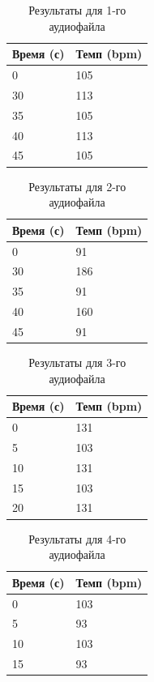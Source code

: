 \begin{table}[!h]
	\begin{center}
		\caption{\label{tab:soad_drums}Результаты для 1-го аудиофайла}
		\begin{tabular}{|p{8cm}|p{8cm}|}
			\hline
			Время (с) & Темп (bpm)\\
			\hline
			0 & 105\\
			\hline
			30 & 113\\
			\hline
			35 & 105\\
			\hline
			40 & 113\\
			\hline
			45 & 105\\
			\hline
		\end{tabular}
	\end{center}
\end{table}

\begin{table}[!h]
	\begin{center}
		\caption{\label{tab:soad_guitar}Результаты для 2-го аудиофайла}
		\begin{tabular}{|p{8cm}|p{8cm}|}
			\hline
			Время (с) & Темп (bpm)\\
			\hline
			0 & 91\\
			\hline
			30 & 186\\
			\hline
			35 & 91\\
			\hline
			40 & 160\\
			\hline
			45 & 91\\
			\hline
		\end{tabular}
	\end{center}
\end{table}

\begin{table}[!h]
	\begin{center}
		\caption{\label{tab:soad_minus}Результаты для 3-го аудиофайла}
		\begin{tabular}{|p{8cm}|p{8cm}|}
			\hline
			Время (с) & Темп (bpm)\\
			\hline
			0 & 131\\
			\hline
			5 & 103\\
			\hline
			10 & 131\\
			\hline
			15 & 103\\
			\hline
			20 & 131\\
			\hline
		\end{tabular}
	\end{center}
\end{table}

\begin{table}[!h]
	\begin{center}
		\caption{\label{tab:soad_full}Результаты для 4-го аудиофайла}
		\begin{tabular}{|p{8cm}|p{8cm}|}
			\hline
			Время (с) & Темп (bpm)\\
			\hline
			0 & 103\\
			\hline
			5 & 93\\
			\hline
			10 & 103\\
			\hline
			15 & 93\\
			\hline
		\end{tabular}
	\end{center}
\end{table}

